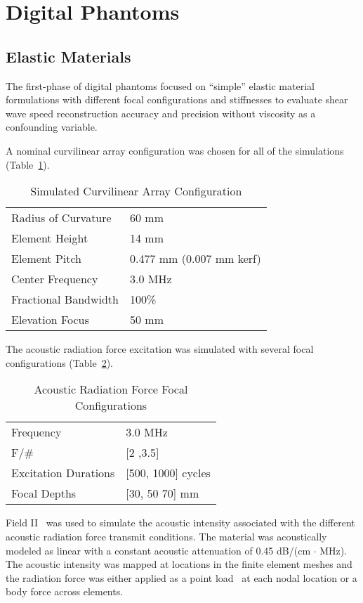 \section{Digital Phantoms}\label{sect:digital_phantoms}

\subsection{Elastic Materials}
The first-phase of digital phantoms focused on ``simple'' elastic material
formulations with different focal configurations and stiffnesses to evaluate
shear wave speed reconstruction accuracy and precision without viscosity as a
confounding variable.

A nominal curvilinear array configuration was chosen for all of the simulations
(Table~\ref{table:curvilinear}).

\begin{table}[htb!]
    \centering
    \caption{Simulated Curvilinear Array Configuration}
    \begin{tabular}{|l|l|}
    \hline
    Radius of Curvature & 60 mm \\
    Element Height & 14 mm \\
    Element Pitch & 0.477 mm (0.007 mm kerf) \\
    Center Frequency & 3.0 MHz \\
    Fractional Bandwidth & 100\% \\
    Elevation Focus & 50 mm \\
    \hline
    \end{tabular}
\label{table:curvilinear}
\end{table}

The acoustic radiation force excitation was simulated with several focal configurations (Table~\ref{table:arf}).

\begin{table}[htb!]
    \centering
    \caption{Acoustic Radiation Force Focal Configurations}
    \begin{tabular}{|l|l|}
    \hline
    Frequency & 3.0 MHz \\
    F/\# & [2 ,3.5] \\
    Excitation Durations & [500, 1000] cycles \\
    Focal Depths & [30, 50 70] mm \\
    \hline
    \end{tabular}
\label{table:arf}
\end{table}

Field II~\cite{Jensen1992} was used to simulate the acoustic intensity
associated with the different acoustic radiation force transmit conditions.
The material was acoustically modeled as linear with a constant acoustic
attenuation of 0.45 dB/(cm $\cdot$ MHz).  The acoustic intensity was mapped at
locations in the finite element meshes and the radiation force was either
applied as a point load~\cite{Palmeri2005} at each nodal location or a body
force across elements.

